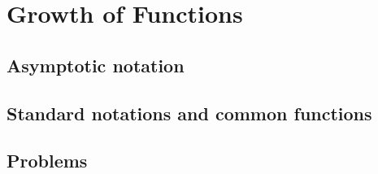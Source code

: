 \chapter{Growth of Functions}
\section{Asymptotic notation}
\renewcommand{\thesubsection}{Exercise \thesection-\arabic{subsection}}
\subsection{}

\setcounter{subsection}{2}
\subsection{}

\subsection{}

\setcounter{subsection}{5}
\subsection{}

\section{Standard notations and common functions}
\subsection{}

\subsection{}

\setcounter{subsection}{5}
\subsection{}

\subsection{}


\section*{Problems}
\setcounter{subsection}{0}
\renewcommand{\thesubsection}{Problem \thechapter-\arabic{subsection}}
\subsection{}

\subsection{}

\subsection{}

\subsection{}

\subsection{}

\subsection{}

